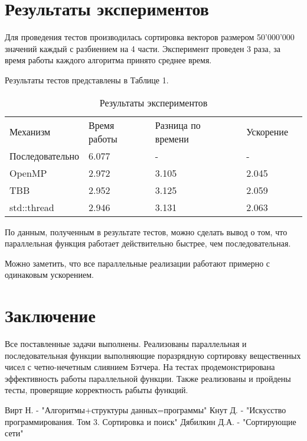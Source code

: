 \documentclass{report}
\begin{document}
	\section*{Результаты экспериментов}
	Для проведения тестов производилась сортировка векторов размером 50'000'000 значений каждый с разбиением на 4 части. Эксперимент проведен 3 раза, за время работы каждого алгоритма принято среднее время. 
	\par Результаты тестов представлены в Таблице 1.
	\begin{table}[!h]
		\caption{Результаты экспериментов}
		\centering
		\begin{tabular}{lllll}
			Механизм        & Время работы    & Разница по времени & Ускорение  \\
			Последовательно & 6.077           & -                  & -          \\
			OpenMP          & 2.972           & 3.105              & 2.045      \\
			TBB             & 2.952           & 3.125              & 2.059      \\
			std::thread     & 2.946           & 3.131              & 2.063      
		\end{tabular}
	\end{table}
	\par По данным, полученным в результате тестов, можно сделать вывод о том, что параллельная функция работает действительно быстрее, чем последовательная.
	\par Можно заметить, что все параллельные реализации работают примерно с одинаковым ускорением.
	\newpage
	
	\section*{Заключение}
	Все поставленные задачи выполнены. Реализованы параллельная и последовательная функции выполняющие поразрядную сортировку вещественных чисел с четно-нечетным слиянием Бэтчера. На тестах продемонстрирована эффективность работы параллельной функции. Также реализованы и пройдены тесты, проверящие корректность рабыты функций.
	\newpage
	
	\begin{thebibliography}{1}
		 Вирт Н. - "Алгоритмы+структуры данных=программы"
		 Кнут Д. - "Искусство программирования. Том 3. Сортировка и поиск"
		 Дябилкин Д.А. - "Сортирующие сети"
	\end{thebibliography}
	\newpage
	
\end{document}
